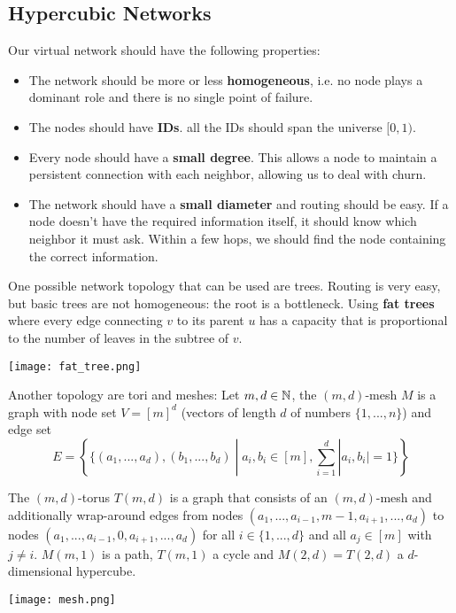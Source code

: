 \subsection{Hypercubic Networks}

Our virtual network should have the following properties:
\begin{itemize}
	\item The network should be more or less \textbf{homogeneous}, i.e. no node plays a dominant role and there is no single point of failure.
	\item The nodes should have \textbf{IDs}. all the IDs should span the universe $[0,1)$.
	\item Every node should have a \textbf{small degree}. This allows a node to maintain a persistent connection with each neighbor, allowing us to deal with churn.
	\item The network should have a \textbf{small diameter} and routing should be easy. If a node doesn’t have the required information itself, it should know which neighbor it must ask. Within a few hops, we should find the node containing the correct information.
\end{itemize}

One possible network topology that can be used are trees. Routing is very easy, but basic trees are not homogeneous: the root is a bottleneck. Using \textbf{fat trees} where every edge connecting $v$ to its parent $u$ has a capacity that is proportional to the number of leaves in the subtree of $v$.
\begin{center}
	\texttt{[image: fat\_tree.png]}
\end{center}

Another topology are tori and meshes: Let $m,d \in \mathbb{N}$, the $(m,d)$-mesh $M$ is a graph with node set $V = [m]^d$ (vectors of length $d$ of numbers $\{1,...,n\}$) and edge set
$$E = \left \{   \{(a_1,...,a_d), (b_1,...,b_d) \; | \; a_i, b_i \in [m], \sum_{i=1}^d |a_i, b_i| = 1 \} \right \}$$

The $(m,d)$-torus $T(m,d)$ is a graph that consists of an $(m,d)$-mesh and additionally wrap-around edges from nodes $(a_1, ..., a_{i-1}, m - 1, a_{i+1}, ..., a_d) $ to nodes $(a_1, ..., a_{i-1}, 0, a_{i+1}, ..., a_d)$ for all $i \in \{1, ...,d\}$ and all $a_j \in [m]$ with $j \neq i$. $M(m,1)$ is a path, $T(m,1)$ a cycle and $M(2,d) = T(2,d)$ a $d$-dimensional hypercube.

\begin{center}
	\texttt{[image: mesh.png]}
\end{center}

